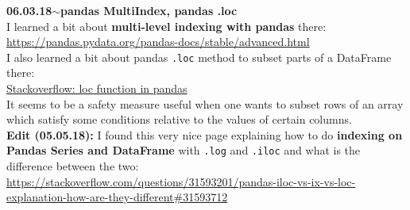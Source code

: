 \documentclass[11pt,a4paper]{article}
\newenvironment{loggentry}[2]%
{\noindent\textbf{#1}\hspace{1cm}$\mathbf{\sim}$\text{ }\textbf{#2}\\}{\vspace{0.5cm}}
\begin{document}
\begin{loggentry}{06.03.18}{pandas MultiIndex, pandas .loc}
I learned a bit about \textbf{multi-level indexing with pandas} there:\\
\url{https://pandas.pydata.org/pandas-docs/stable/advanced.html}\\
I also learned a bit about pandas \texttt{.loc} method to subset parts of a DataFrame there:\\
\href{https://stackoverflow.com/questions/31571217/loc-function-in-pandas#31585881}{Stackoverflow: loc function in pandas}\\
It seems to be a safety measure useful when one wants to subset rows of an array which satisfy some conditions relative to the values of certain columns.\\
\textbf{Edit (05.05.18):} I found this very nice page explaining how to do \textbf{indexing on Pandas Series and DataFrame} with \texttt{.log} and \texttt{.iloc} and what is the difference between the two:\\
\url{https://stackoverflow.com/questions/31593201/pandas-iloc-vs-ix-vs-loc-explanation-how-are-they-different#31593712}
\end{loggentry}
\end{document}
